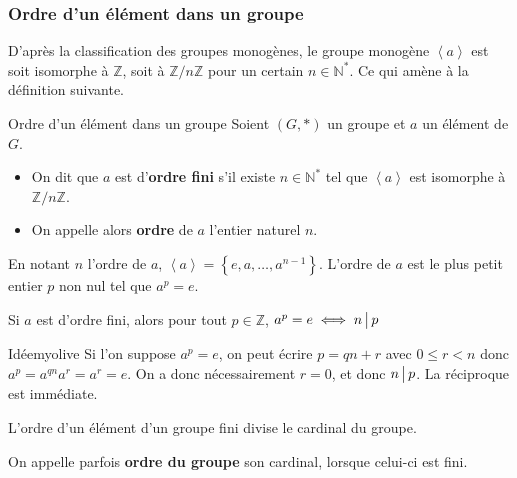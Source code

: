     \subsubsection{Ordre d’un élément dans un groupe}

    D’après la classification des groupes monogènes, le groupe monogène $\left< a \right>$ est soit isomorphe à $\mathbb{Z}$, soit à $\mathbb{Z} / n \mathbb{Z}$ pour un certain $n \in \mathbb{N}^*$. Ce qui amène à la définition suivante.

    \begin{defi}{Ordre d’un élément dans un groupe}{}
        Soient $(G,*)$ un groupe et $a$ un élément de $G$.
        \begin{itemize}
            \item On dit que $a$ est d’\textbf{ordre fini} s’il existe $n \in \mathbb{N}^*$ tel que $\left< a \right>$ est isomorphe à $\mathbb{Z} / n \mathbb{Z}$.
            \item On appelle alors \textbf{ordre} de $a$ l’entier naturel $n$.
        \end{itemize}
    \end{defi}

    En notant $n$ l’ordre de $a$, $\left< a \right> = \left\{ e, a, \ldots, a^{n-1} \right\}$. L’ordre de $a$ est le plus petit entier $p$ non nul tel que $a^p = e$.

    \begin{prop}{}{}
        Si $a$ est d’ordre fini, alors pour tout $p \in \mathbb{Z}$, $a^p = e \iff n \, \big| \, p$
    \end{prop}

    \begin{demo}{Idée}{myolive}
        Si l’on suppose $a^p = e$, on peut écrire $p = qn + r$ avec $0 \leq r < n$ donc $a^p = a^{qn} a^r = a^r = e$. On a donc nécessairement $r = 0$, et donc $n \, \big| \, p$. La réciproque est immédiate.
    \end{demo}

    \begin{theo}{}{}
        L’ordre d’un élément d’un groupe fini divise le cardinal du groupe.
    \end{theo}

    On appelle parfois \textbf{ordre du groupe} son cardinal, lorsque celui-ci est fini.

